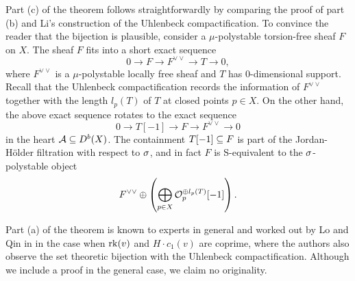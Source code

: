 Part (c) of the theorem follows straightforwardly by comparing the proof of part (b) and Li's construction of the Uhlenbeck compactification. To convince the reader that the bijection is plausible, consider a $\mu$-polystable torsion-free sheaf $F$ on $X$. The sheaf $F$ fits into a short exact sequence
\[ 0 \to F \to F^{\vee\vee} \to T \to 0, \]
where $F^{\vee\vee}$ is a $\mu$-polystable locally free sheaf and $T$ has 0-dimensional support. Recall that the Uhlenbeck compactification records the information of $F^{\vee\vee}$ together with the length $l_p(T)$ of $T$ at closed points $p \in X$. On the other hand, the above exact sequence rotates to the exact sequence
\[ 0 \to T[-1] \to F \to F^{\vee\vee} \to 0 \]
in the heart $\mathcal{A} \subseteq D^b(X)$. The containment $T[-1] \subseteq F$ is part of the Jordan-H\"older filtration with respect to $\sigma$, and in fact $F$ is S-equivalent to the $\sigma$-polystable object
\[ F^{\vee\vee} \oplus \left(\bigoplus_{p \in X} \mathcal{O}_p^{\oplus l_p(T)}[-1]\right). \]

Part (a) of the theorem is known to experts in general and worked out by Lo and Qin in \cite{LQ} in the case when $\operatorname{\mathrm{rk}}(v)$ and $H \cdot c_1(v)$ are coprime, where the authors also observe the set theoretic bijection with the Uhlenbeck compactification. Although we include a proof in the general case, we claim no originality.

